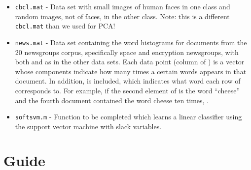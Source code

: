 \documentclass[11pt,noanswers,addpoints]{exam}
\begin{document}
\begin{itemize}

\item \texttt{cbcl.mat} - Data set with small images of human faces in one class and random images,
not of faces, in the other class. Note: this is a different \texttt{cbcl.mat} than we used for PCA! %

\item \texttt{news.mat} - Data set containing the word histograms for documents from the 
20 newsgroups corpus, specifically space and encryption newsgroups, with both  and 
as in the other data sets. Each data point (column of ) is a vector whose components indicate how many times a certain words appears in that document. In addition,  is included, which indicates what word each row of 
 corresponds to. For example, if the second element of  is the word ``cheese'' and the 
fourth document contained the word cheese ten times, .

\item \texttt{softsvm.m} - Function to be completed which learns a linear classifier
using the support vector machine with slack variables.
\end{itemize}

\section{Guide}
\end{document}
